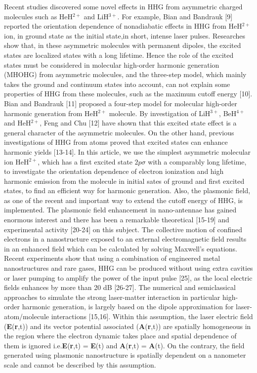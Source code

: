 \documentclass[%
reprint,
twocolumn,
 amsmath,amssymb,
 aps,
pra,
 showpacs
]{revtex4-1}
\begin{document}
Recent studies discovered some novel effects in HHG from asymmetric charged molecules such as HeH$^{2+}$ and LiH$^{3+}$. For example, Bian and Bandrauk [9] reported the orientation dependence of nonadiabatic effects in HHG from HeH$^{2+}$ ion, in ground state as the initial state,in short, intense laser pulses. Researches show that, in these asymmetric molecules with permanent dipoles, the excited states are localized states with a long lifetime. Hence the role of the excited states must be considered in molecular high-order harmonic generation (MHOHG) from asymmetric molecules, and the three-step model, which mainly takes the ground and continuum states into account, can not explain some properties of HHG from these molecules, such as the maximum cutoff energy [10]. Bian and Bandrauk [11] proposed a four-step model for molecular high-order harmonic generation from HeH$^{2+}$ molecule. By investigation of LiH$^{3+}$, BeH$^{4+}$ and HeH$^{2+}$, Feng and Chu [12] have shown that this excited state effect is a general character of the asymmetric molecules. On the other hand, previous investigations of HHG from atoms proved that excited states can enhance harmonic yields [13-14]. In this article, we use the simplest asymmetric molecular ion HeH$^{2+}$, which has a first excited state $2p\sigma$ with a comparably long lifetime, to investigate the orientation dependence of electron ionization and high harmonic emission from the molecule in initial sates of ground   and first excited states, to find an efficient way for harmonic generation.  Also, the plasmonic field, as one of the recent and important way to extend the cutoff energy of HHG, is implemented. The plasmonic field enhancement in nano-antennae has gained enormous interest and there has been a remarkable theoretical [15-19] and experimental activity [20-24] on this subject. The collective motion of confined electrons in a nanostructure exposed to an external electromagnetic field results in an enhanced field which can be calculated by solving Maxwell's equations. Recent experiments show that using a combination of engineered metal nanostructures and rare gases, HHG can be produced without using extra cavities or laser pumping to amplify the power of the input pulse [25], as the local electric fields enhances by more than 20 dB [26-27].
The numerical and semiclassical approaches to simulate the strong laser-matter interaction in particular high-order harmonic generation, is largely based on the dipole approximation for laser-atom/molecule interactions [15,16]. Within this assumption, the laser electric field (\textbf{E}(\textbf{r},t)) and its vector potential associated (\textbf{A}(\textbf{r},t)) are spatially homogeneous in the region where the electron dynamic takes place and spatial dependence of them is ignored i.e.\textbf{E}(\textbf{r},t) = \textbf{E}(t) and \textbf{A}(\textbf{r},t) = \textbf{A}(t). On the contrary, the field generated using plasmonic nanostructure is spatially dependent on a nanometer scale and cannot be described by this assumption.\\
\end{document}
